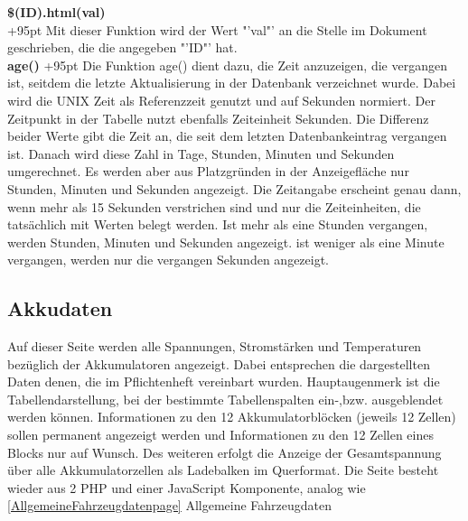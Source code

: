 \documentclass[fontsize = 12pt, paper = a4]{scrreprt}
\begin{document}
\textbf{\$(ID).html(val)}\\
\hangindent+95pt  
Mit dieser Funktion wird der Wert "'val"' an die Stelle im Dokument geschrieben, die die angegeben "'ID"' hat.\\


\textbf{age()}
\hspace{20mm}
\hangindent+95pt  
Die Funktion age() dient dazu, die Zeit anzuzeigen, die vergangen ist, seitdem die letzte Aktualisierung in der Datenbank verzeichnet wurde. Dabei wird die UNIX Zeit als Referenzzeit genutzt und auf Sekunden normiert. Der Zeitpunkt in der Tabelle nutzt ebenfalls Zeiteinheit Sekunden. Die Differenz beider Werte gibt die Zeit an, die seit dem letzten Datenbankeintrag vergangen ist. Danach wird diese Zahl in Tage, Stunden, Minuten und Sekunden umgerechnet. Es werden aber aus Platzgründen in der Anzeigefläche nur Stunden, Minuten und Sekunden angezeigt. Die Zeitangabe erscheint genau dann, wenn mehr als 15 Sekunden verstrichen sind und nur die Zeiteinheiten, die tatsächlich mit Werten belegt werden. Ist mehr als eine Stunden vergangen, werden Stunden, Minuten und Sekunden angezeigt. ist weniger als eine Minute vergangen, werden nur die vergangen Sekunden angezeigt.\\ 





\label{akkudatenpage}
\subsection{Akkudaten}

Auf dieser Seite werden alle Spannungen, Stromstärken und Temperaturen bezüglich der Akkumulatoren angezeigt. Dabei entsprechen die dargestellten Daten denen, die im Pflichtenheft vereinbart wurden. Hauptaugenmerk  ist die Tabellendarstellung, bei der bestimmte Tabellenspalten ein-,bzw. ausgeblendet werden können. Informationen zu den 12 Akkumulatorblöcken (jeweils 12 Zellen) sollen permanent angezeigt werden und Informationen zu den 12 Zellen eines Blocks nur auf Wunsch. Des weiteren erfolgt die Anzeige der Gesamtspannung über alle Akkumulatorzellen als Ladebalken im Querformat. Die Seite besteht wieder aus 2 PHP  und einer JavaScript Komponente, analog wie \ref{AllgemeineFahrzeugdatenpage} Allgemeine Fahrzeugdaten   
\end{document}
